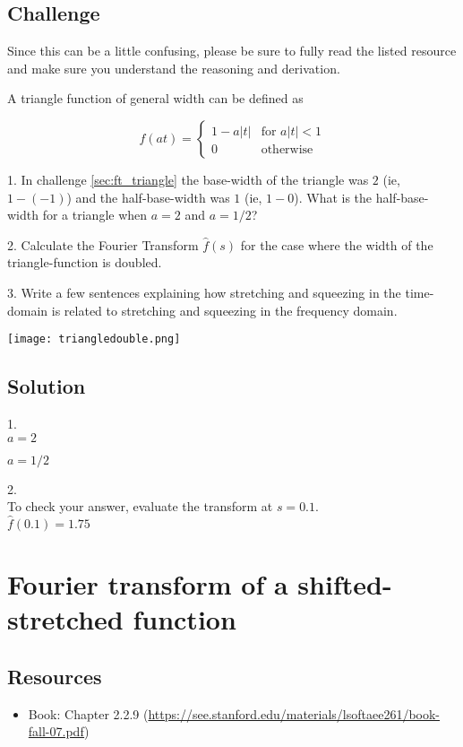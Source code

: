 \subsection*{Challenge}
Since this can be a little confusing, please be sure to fully read the listed resource and make sure you understand the reasoning and derivation.

A triangle function of general width can be defined as

\begin{equation}
    f(at)=
    \begin{cases}
        1 - a|t| & \text{for } a|t| < 1\\
        0 & \text{otherwise}
    \end{cases}
\end{equation}

1. In challenge \ref{sec:ft_triangle} the base-width of the triangle was $2$ (ie, $1-(-1)$) and the half-base-width was $1$ (ie, $1-0$). What is the half-base-width for a triangle when $a=2$ and $a=1/2$?

2. Calculate the Fourier Transform $\hat{f}(s)$ for the case where the width of the triangle-function is doubled.

3. Write a few sentences explaining how stretching and squeezing in the time-domain is related to stretching and squeezing in the frequency domain.

\texttt{[image: triangledouble.png]}

\subsection*{Solution}
1.\\
$a=2$\\

$a=1/2$\\

2.\\
To check your answer, evaluate the transform at $s=0.1$.\\
$\hat{f}(0.1)=1.75$




\newpage
\section{Fourier transform of a shifted-stretched function}
\label{sec:shiftstretch}

\subsection*{Resources}
\begin{itemize}
    \item Book: Chapter 2.2.9 (\url{https://see.stanford.edu/materials/lsoftaee261/book-fall-07.pdf})
\end{itemize}

